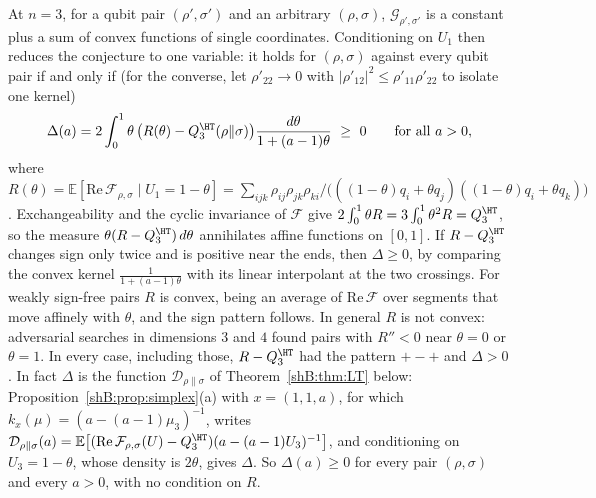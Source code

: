 \begin{remark}
At $n=3$, for a qubit pair $(\rho',\sigma')$ and an arbitrary $(\rho,\sigma)$, $\mathcal G_{\rho',\sigma'}$ is a constant plus a sum of convex functions of single coordinates. Conditioning on $U_1$ then reduces the conjecture to one variable: it holds for $(\rho,\sigma)$ against every qubit pair if and only if (for the converse, let $\rho'_{22}\to0$ with $|\rho'_{12}|^2\le\rho'_{11}\rho'_{22}$ to isolate one kernel)
\[
\Delta(a)=2\int_0^1\theta\,\big(R(\theta)-Q^\HT_3(\rho\|\sigma)\big)\frac{d\theta}{1+(a-1)\theta}\ \ge\ 0\qquad\text{for all }a>0,
\]
where $R(\theta)=\mathbb E[\mathrm{Re}\,\mathcal F_{\rho,\sigma}\mid U_1=1-\theta]=\sum_{ijk}\rho_{ij}\rho_{jk}\rho_{ki}\big/\big(((1-\theta)q_i+\theta q_j)((1-\theta)q_i+\theta q_k)\big)$. Exchangeability and the cyclic invariance of $\mathcal F$ give $2\int_0^1\theta R=3\int_0^1\theta^2R=Q^\HT_3$, so the measure $\theta(R-Q^\HT_3)\,d\theta$ annihilates affine functions on $[0,1]$. If $R-Q^\HT_3$ changes sign only twice and is positive near the ends, then $\Delta\ge0$, by comparing the convex kernel $\frac1{1+(a-1)\theta}$ with its linear interpolant at the two crossings. For weakly sign-free pairs $R$ is convex, being an average of $\mathrm{Re}\,\mathcal F$ over segments that move affinely with $\theta$, and the sign pattern follows. In general $R$ is not convex: adversarial searches in dimensions $3$ and $4$ found pairs with $R''<0$ near $\theta=0$ or $\theta=1$. In every case, including those, $R-Q^\HT_3$ had the pattern $+-+$ and $\Delta>0$. In fact $\Delta$ is the function $\mathcal D_{\rho\|\sigma}$ of Theorem~\ref{shB:thm:LT} below: Proposition~\ref{shB:prop:simplex}(a) with $x=(1,1,a)$, for which $k_x(\mu)=(a-(a-1)\mu_3)^{-1}$, writes $\mathcal D_{\rho\|\sigma}(a)=\mathbb E\big[(\mathrm{Re}\,\mathcal F_{\rho,\sigma}(U)-Q^\HT_3)(a-(a-1)U_3)^{-1}\big]$, and conditioning on $U_3=1-\theta$, whose density is $2\theta$, gives $\Delta$. So $\Delta(a)\ge0$ for every pair $(\rho,\sigma)$ and every $a>0$, with no condition on $R$.


\end{remark}
